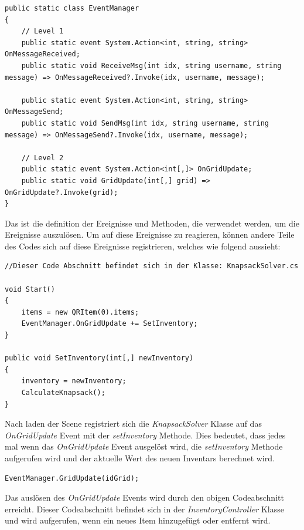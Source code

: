 \begin{lstlisting}[style=csharp, label=code:EventManager]
public static class EventManager
{
    // Level 1
    public static event System.Action<int, string, string> OnMessageReceived;
    public static void ReceiveMsg(int idx, string username, string message) => OnMessageReceived?.Invoke(idx, username, message);

    public static event System.Action<int, string, string> OnMessageSend;
    public static void SendMsg(int idx, string username, string message) => OnMessageSend?.Invoke(idx, username, message);

    // Level 2
    public static event System.Action<int[,]> OnGridUpdate;
    public static void GridUpdate(int[,] grid) => OnGridUpdate?.Invoke(grid);
}
\end{lstlisting}

Das ist die definition der Ereignisse und Methoden, die verwendet werden, um die Ereignisse auszulösen.
Um auf diese Ereignisse zu reagieren, können andere Teile des Codes sich auf diese Ereignisse registrieren, welches wie folgend
aussieht:

\begin{lstlisting}[style=csharp label=code:Event Registration]
//Dieser Code Abschnitt befindet sich in der Klasse: KnapsackSolver.cs

void Start()
{
    items = new QRItem(0).items;
    EventManager.OnGridUpdate += SetInventory;
}

public void SetInventory(int[,] newInventory)
{
    inventory = newInventory;
    CalculateKnapsack();
}
\end{lstlisting}

Nach laden der Scene registriert sich die \textit{KnapsackSolver} Klasse auf das \textit{OnGridUpdate} Event mit
der \textit{setInventory} Methode. Dies bedeutet, dass jedes mal wenn das \textit{OnGridUpdate} Event ausgelöst wird,
die \textit{setInventory} Methode aufgerufen wird und der aktuelle Wert des neuen Inventars berechnet wird.

\begin{lstlisting}[style=csharp label=code:Event Trigger]
EventManager.GridUpdate(idGrid);
\end{lstlisting}

Das auslösen des \textit{OnGridUpdate} Events wird durch den obigen Codeabschnitt erreicht. Dieser Codeabschnitt befindet
sich in der \textit{InventoryController} Klasse und wird aufgerufen, wenn ein neues Item hinzugefügt oder entfernt wird.

